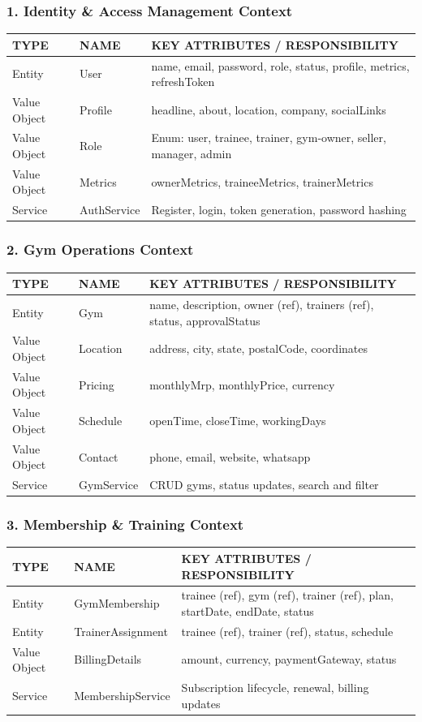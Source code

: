 \documentclass[11pt,a4paper]{article}
\begin{document}
\subsubsection*{1. Identity \& Access Management Context}
\noindent
\begin{tabularx}{\textwidth}{l l X}
\toprule
\textbf{TYPE} & \textbf{NAME} & \textbf{KEY ATTRIBUTES / RESPONSIBILITY} \\
\midrule
Entity & User & name, email, password, role, status, profile, metrics, refreshToken \\
Value Object & Profile & headline, about, location, company, socialLinks \\
Value Object & Role & Enum: user, trainee, trainer, gym-owner, seller, manager, admin \\
Value Object & Metrics & ownerMetrics, traineeMetrics, trainerMetrics \\
Service & AuthService & Register, login, token generation, password hashing \\
\bottomrule
\end{tabularx}

\subsubsection*{2. Gym Operations Context}
\noindent
\begin{tabularx}{\textwidth}{l l X}
\toprule
\textbf{TYPE} & \textbf{NAME} & \textbf{KEY ATTRIBUTES / RESPONSIBILITY} \\
\midrule
Entity & Gym & name, description, owner (ref), trainers (ref), status, approvalStatus \\
Value Object & Location & address, city, state, postalCode, coordinates \\
Value Object & Pricing & monthlyMrp, monthlyPrice, currency \\
Value Object & Schedule & openTime, closeTime, workingDays \\
Value Object & Contact & phone, email, website, whatsapp \\
Service & GymService & CRUD gyms, status updates, search and filter \\
\bottomrule
\end{tabularx}

\subsubsection*{3. Membership \& Training Context}
\noindent
\begin{tabularx}{\textwidth}{l l X}
\toprule
\textbf{TYPE} & \textbf{NAME} & \textbf{KEY ATTRIBUTES / RESPONSIBILITY} \\
\midrule
Entity & GymMembership & trainee (ref), gym (ref), trainer (ref), plan, startDate, endDate, status \\
Entity & TrainerAssignment & trainee (ref), trainer (ref), status, schedule \\
Value Object & BillingDetails & amount, currency, paymentGateway, status \\
Service & MembershipService & Subscription lifecycle, renewal, billing updates \\
\bottomrule
\end{tabularx}
\end{document}
